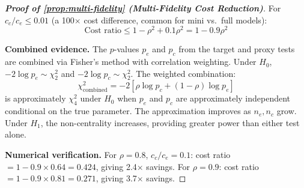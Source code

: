 \begin{proof}[\textbf{Proof of \cref{prop:multi-fidelity} (Multi-Fidelity Cost Reduction)}]
For $c_c/c_e \leq 0.01$ (a 100$\times$ cost difference, common for
mini vs.\ full models):
\begin{equation}
  \text{Cost ratio} \leq 1 - \rho^2 + 0.1\rho^2 = 1 - 0.9\rho^2
\end{equation}

\textbf{Combined evidence.} The $p$-values $p_e$ and $p_c$ from the
target and proxy tests are combined via Fisher's method with
correlation weighting. Under $H_0$, $-2\log p_e \sim \chi^2_2$ and
$-2\log p_c \sim \chi^2_2$. The weighted combination:
\begin{equation}
  \chi^2_{\mathrm{combined}} = -2[\rho \log p_c + (1-\rho) \log p_e]
\end{equation}
is approximately $\chi^2_4$ under $H_0$ when $p_e$ and $p_c$ are
approximately independent conditional on the true parameter. The
approximation improves as $n_e, n_c$ grow. Under $H_1$, the
non-centrality increases, providing greater power than either test
alone.

\textbf{Numerical verification.} For $\rho = 0.8$, $c_c/c_e = 0.1$:
cost ratio $= 1 - 0.9 \times 0.64 = 0.424$, giving 2.4$\times$
savings. For $\rho = 0.9$: cost ratio $= 1 - 0.9 \times 0.81 = 0.271$,
giving 3.7$\times$ savings. \qedhere
\end{proof}



